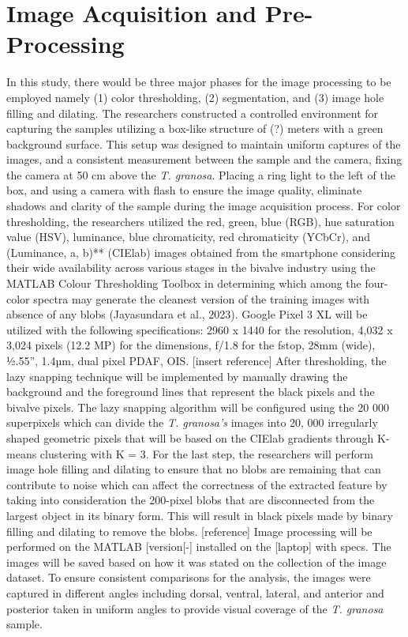\section{Image Acquisition and Pre-Processing}
In this study, there would be three major phases for the image processing to be employed namely (1) color thresholding, (2) segmentation, and (3) image hole filling and dilating. The researchers constructed a controlled environment for capturing the samples utilizing a box-like structure of (?) meters with a green background surface. This setup was designed to maintain uniform captures of the images, and a consistent measurement between the sample and the camera, fixing the camera at 50 cm above the \textit{T. granosa}. Placing a ring light to the left of the box, and using a camera with flash to ensure the image quality, eliminate shadows and clarity of the sample during the image acquisition process. 
For color thresholding, the researchers utilized the red, green, blue (RGB), hue saturation value (HSV), luminance, blue chromaticity, red chromaticity (YCbCr), and (Luminance, a, b)** (CIElab) images obtained from the smartphone considering their wide availability across various stages in the bivalve industry using the MATLAB Colour Thresholding Toolbox in determining which among the four-color spectra may generate the cleanest version of the training images with absence of any blobs (Jayasundara et al., 2023). Google Pixel 3 XL will be utilized with the following specifications: 2960 x 1440 for the resolution, 4,032 x 3,024 pixels (12.2 MP) for the dimensions, f/1.8 for the fstop, 28mm (wide), ½.55”, 1.4µm, dual pixel PDAF, OIS. [insert reference]
After thresholding, the lazy snapping technique will be implemented by manually drawing the background and the foreground lines that represent the black pixels and the bivalve pixels. The lazy snapping algorithm will be configured using the 20 000 superpixels which can divide the \textit{T. granosa’s} images into 20, 000 irregularly shaped geometric pixels that will be based on the CIElab gradients through K-means clustering with K = 3. For the last step, the researchers will perform image hole filling and dilating to ensure that no blobs are remaining that can contribute to noise which can affect the correctness of the extracted feature by taking into consideration the 200-pixel blobs that are disconnected from the largest object in its binary form. This will result in black pixels made by binary filling and dilating to remove the blobs.  [reference]
Image processing will be performed on the MATLAB [version[-] installed on the [laptop] with specs. The images will be saved based on how it was stated on the collection of the image dataset. 
To ensure consistent comparisons for the analysis, the images were captured in different angles including dorsal, ventral, lateral, and anterior and posterior taken in uniform angles to provide visual coverage of the \textit{T. granosa} sample. 
